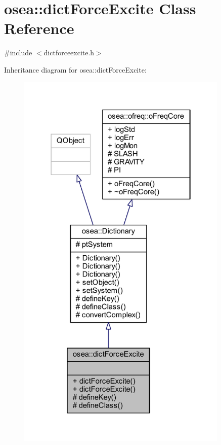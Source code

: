 \hypertarget{classosea_1_1dict_force_excite}{\section{osea\-:\-:dict\-Force\-Excite Class Reference}
\label{classosea_1_1dict_force_excite}
}


{\ttfamily \#include $<$dictforceexcite.\-h$>$}



Inheritance diagram for osea\-:\-:dict\-Force\-Excite\-:
\nopagebreak
\begin{figure}[H]
\begin{center}
\leavevmode
\includegraphics[width=286pt]{classosea_1_1dict_force_excite__inherit__graph}
\end{center}
\end{figure}
